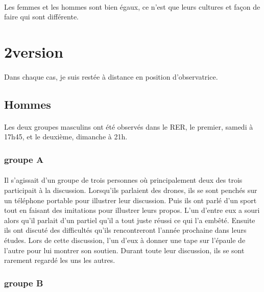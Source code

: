 \paragraph{} Les femmes et les hommes sont bien égaux, ce n'est que leurs
cultures et façon de faire qui sont différente.

\section{2\ieme version}

\paragraph{} Dans chaque cas, je suis restée à distance en position
d'observatrice.

\subsection{Hommes}

\paragraph{} Les deux groupes masculins ont été observés dans le RER, le
premier, samedi à 17h45, et le deuxième, dimanche à 21h.

\subsubsection{groupe A}

\paragraph{} Il s'agissait d'un groupe de trois personnes où principalement
deux des trois participait à la discussion. Lorsqu'ils parlaient des drones,
ils se sont penchés sur un téléphone portable pour illustrer leur discussion.
Puis ils ont parlé d'un sport tout en faisant des imitations pour illustrer
leurs propos. L'un d'entre eux a souri alors qu'il parlait d'un partiel qu'il a
tout juste réussi ce qui l'a embêté. Ensuite ils ont discuté des difficultés
qu'ils rencontreront l'année prochaine dans leurs études. Lors de cette
discussion, l'un d'eux à donner une tape sur l'épaule de l'autre pour lui
montrer son soutien. Durant toute leur discussion, ils se sont rarement regardé
les uns les autres.

\subsubsection{groupe B}

